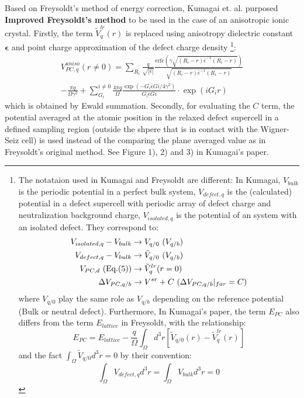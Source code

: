 \documentclass{article}
\begin{document}
Based on Freysoldt's method of energy correction, Kumagai et. al. purposed \textbf{Improved Freysoldt's method} to be used in the case of 
an anisotropic ionic crystal. Firstly, the term $\tilde{V}^{lr}_{q}(r)$ is replaced using anisotropy dielectric constant $\mathbf{\epsilon}$ and point charge
approximation of the defect charge density
\footnote{
    The notataion used in Kumagai and Freysoldt are different: In Kumagai, $V_{bulk}$ is the periodic potential in a perfect bulk system, $V_{defect,q}$
    is the (calculated) potential in a defect supercell with periodic array of defect charge and neutralization background charge, $V_{isolated,q}$ is the 
    potential of an system with an isolated defect. They correspond to:
    \begin{align}
        V_{isolated,q} - V_{bulk} &\to V_{q/0} \ (V_{q/b}) \notag \\
        V_{defect,q} - V_{bulk} &\to \tilde{V}_{q/0} \ (V_{q/b}) \notag \\
        V_{PC,d} \text{ (Eq.(5))} &\to \tilde{V}^{lr}_{q}(r=0) \notag \\
        \Delta V_{PC,q/b} &\to  V^{sr} + C \ (\Delta V_{PC,q/b} |_{far} = C) \notag
    \end{align}
    where $V_{q/0}$ play the same role as $V_{q/b}$ depending on the reference potential (Bulk or neutral defect). 
    Furthermore, In Kumagai's paper, the term $E_{PC}$ also differs from the term $E_{lattice}$ in Freysoldt, with the relationship:
    \begin{equation}
        E_{PC} = E_{lattice} - \frac{q}{\Omega} \int_{\Omega} d^3 r [ \tilde{V}_{q/0}(r) - \tilde{V}^{lr}_{q}(r) ]
    \end{equation} 
    and the fact $\int_{\Omega} \tilde{V}_{q/0} d^3 r = 0 $ by their convention:
    \begin{equation}
        \int_{\Omega} V_{defect,q} d^3 r = \int_{\Omega} V_{bulk} d^3 r = 0
    \end{equation}
}:
\begin{align}
    V_{PC,q}^{aniso} (r\neq 0) 
    = \sum_{R_i} \frac{q}{\sqrt{|\bar{\epsilon}|}} \frac{\text{erfc}(\gamma \sqrt{(R_i-r) \bar{\epsilon}^{-1} (R_i-r) })}{\sqrt{(R_i-r) \bar{\epsilon}^{-1} (R_i-r) }} \\
        - \frac{\pi q}{\Omega \gamma^2} + \sum_{G_i}^{i\neq 0} \frac{4\pi q}{\Omega} \frac{\exp(- G_i \bar{\epsilon} Gi / 4\gamma^2)}{G_i \bar{\epsilon} Gi} \cdot \exp(iG_i r)
\end{align}
which is obtained by Ewald summation. Secondly, for evaluating the $C$ term, the potential averaged at the atomic position in the relaxed defect supercell in a defined sampling 
region (outside the shpere that is in contact with the Wigner-Seiz cell)
is used instead of the comparing the plane averaged value as in Freysoldt's original method. See Figure 1), 2) and 3) in Kumagai's paper.
\end{document}

